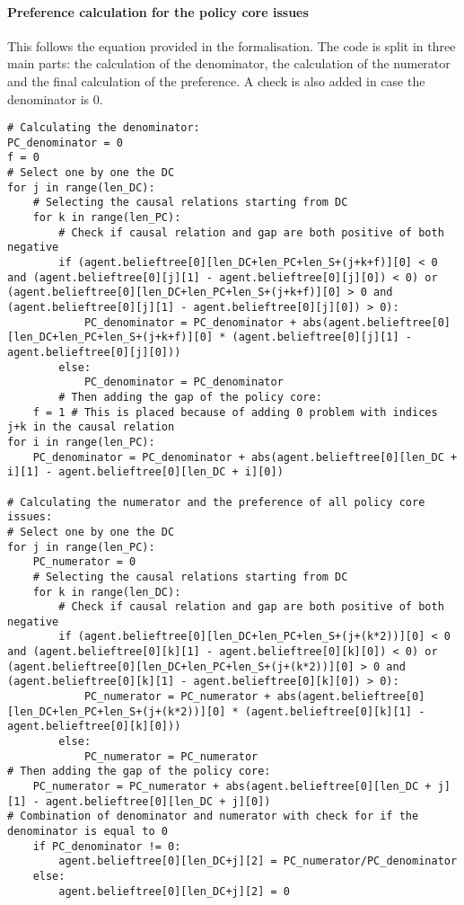 \paragraph{Preference calculation for the policy core issues}

This follows the equation provided in the formalisation. The code is split in three main parts: the calculation of the denominator, the calculation of the numerator and the final calculation of the preference. A check is also added in case the denominator is 0.

\begin{lstlisting}
# Calculating the denominator:
PC_denominator = 0
f = 0
# Select one by one the DC
for j in range(len_DC):
	# Selecting the causal relations starting from DC
	for k in range(len_PC):
		# Check if causal relation and gap are both positive of both negative
		if (agent.belieftree[0][len_DC+len_PC+len_S+(j+k+f)][0] < 0 and (agent.belieftree[0][j][1] - agent.belieftree[0][j][0]) < 0) or (agent.belieftree[0][len_DC+len_PC+len_S+(j+k+f)][0] > 0 and (agent.belieftree[0][j][1] - agent.belieftree[0][j][0]) > 0):
			PC_denominator = PC_denominator + abs(agent.belieftree[0][len_DC+len_PC+len_S+(j+k+f)][0] * (agent.belieftree[0][j][1] - agent.belieftree[0][j][0]))
		else:
			PC_denominator = PC_denominator
		# Then adding the gap of the policy core:
	f = 1 # This is placed because of adding 0 problem with indices j+k in the causal relation
for i in range(len_PC):
	PC_denominator = PC_denominator + abs(agent.belieftree[0][len_DC + i][1] - agent.belieftree[0][len_DC + i][0])

# Calculating the numerator and the preference of all policy core issues:
# Select one by one the DC
for j in range(len_PC):
	PC_numerator = 0
	# Selecting the causal relations starting from DC
	for k in range(len_DC):
		# Check if causal relation and gap are both positive of both negative
		if (agent.belieftree[0][len_DC+len_PC+len_S+(j+(k*2))][0] < 0 and (agent.belieftree[0][k][1] - agent.belieftree[0][k][0]) < 0) or (agent.belieftree[0][len_DC+len_PC+len_S+(j+(k*2))][0] > 0 and (agent.belieftree[0][k][1] - agent.belieftree[0][k][0]) > 0):
			PC_numerator = PC_numerator + abs(agent.belieftree[0][len_DC+len_PC+len_S+(j+(k*2))][0] * (agent.belieftree[0][k][1] - agent.belieftree[0][k][0]))
		else:
			PC_numerator = PC_numerator
# Then adding the gap of the policy core:
	PC_numerator = PC_numerator + abs(agent.belieftree[0][len_DC + j][1] - agent.belieftree[0][len_DC + j][0])
# Combination of denominator and numerator with check for if the denominator is equal to 0
	if PC_denominator != 0:
		agent.belieftree[0][len_DC+j][2] = PC_numerator/PC_denominator 
	else:
		agent.belieftree[0][len_DC+j][2] = 0
\end{lstlisting}

